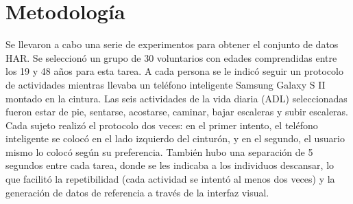 \documentclass{esannV2}
\begin{document}
\section{Metodología}
Se llevaron a cabo una serie de experimentos para obtener el conjunto de datos HAR. Se seleccionó un grupo de 30 voluntarios con edades comprendidas entre los 19 y 48 años para esta tarea. A cada persona se le indicó seguir un protocolo de actividades mientras llevaba un teléfono inteligente Samsung Galaxy S II montado en la cintura. Las seis actividades de la vida diaria (ADL) seleccionadas fueron estar de pie, sentarse, acostarse, caminar, bajar escaleras y subir escaleras. Cada sujeto realizó el protocolo dos veces: en el primer intento, el teléfono inteligente se colocó en el lado izquierdo del cinturón, y en el segundo, el usuario mismo lo colocó según su preferencia. También hubo una separación de 5 segundos entre cada tarea, donde se les indicaba a los individuos descansar, lo que facilitó la repetibilidad (cada actividad se intentó al menos dos veces) y la generación de datos de referencia a través de la interfaz visual.

\begin{table}[h!]
    \centering
    \caption{Protocolo de actividades para el Experimento HAR.}
    \label{tab:har_protocol}
\end{table}
\end{document}
